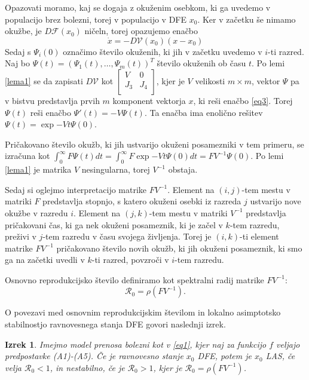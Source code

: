 \documentclass[a4paper,12pt]{article}
\newcommand{\R}{\mathcal R}
\newcommand{\F}{\mathcal F}
\newcommand{\V}{\mathcal V}
\newtheorem{izrek}{Izrek}
\begin{document}
Opazovati moramo, kaj se dogaja z okuženim osebkom, ki ga uvedemo v populacijo brez 
bolezni, torej v populacijo v DFE \(x_0\). Ker v začetku še nimamo okužbe, je 
\(D\F(x_0)\) ničeln, torej opazujemo enačbo
\begin{equation}\label{eq3}
    \dot{x}=-D\V(x_0)(x-x_0)
\end{equation}
Sedaj s \(\Psi_i(0)\) označimo število okuženih, ki jih v začetku uvedemo v \(i\)-ti 
razred. Naj bo \(\Psi(t)=(\Psi_1(t),\ldots,\Psi_m(t))^T\) število okuženih ob času \(t\). 
Po lemi \ref{lema1} se da zapisati \(D\V\) kot 
\(
\begin{bmatrix}
    V & 0 \\
    J_3 & J_4 \\
\end{bmatrix}
\),
kjer je \(V\) velikosti \(m \times m\), vektor \(\Psi\) pa v bistvu
predstavlja prvih \(m\) komponent vektorja \(x\), ki reši enačbo \ref{eq3}. Torej 
\(\Psi(t)\) reši enačbo \(\Psi'(t)=-V\Psi(t)\). Ta enačba ima enolično rešitev 
\(\Psi(t)=\exp{-Vt}\Psi(0)\).

Pričakovano število okužb, ki jih ustvarijo okuženi posamezniki v tem primeru,
se izračuna kot \(\int_0^\infty F\Psi(t)dt = \int_0^\infty F\exp{-Vt}\Psi(0)dt = FV^{-1}\Psi(0)\).
Po lemi \ref{lema1} je matrika \(V\) nesingularna, torej \(V^{-1}\) obstaja. 

Sedaj si oglejmo interpretacijo matrike \(FV^{-1}\). Element na \((i,j)\)-tem mestu
v matriki \(F\) predstavlja stopnjo, s katero okuženi osebki iz razreda \(j\)
ustvarijo nove okužbe v razredu \(i\). Element na \((j,k)\)-tem mestu v matriki \(V^{-1}\)
predstavlja pričakovani čas, ki ga nek okuženi posameznik, ki je začel v \(k\)-tem razredu, 
preživi v \(j\)-tem razredu v času svojega življenja. Torej je \((i,k)\)-ti element 
matrike \(FV^{-1}\) pričakovano število novih okužb, ki jih okuženi posameznik, ki 
smo ga na začetki uvedli v \(k\)-ti razred, povzroči v \(i\)-tem razredu.

Osnovno reprodukcijsko število definiramo kot spektralni radij matrike \(FV^{-1}\):
\[\R_0=\rho(FV^{-1}).\]

O povezavi med osnovnim reprodukcijskim številom in lokalno asimptotsko stabilnostjo 
ravnovesnega stanja DFE govori naslednji izrek.

\begin{izrek}\label{izrek1}
    Imejmo model prenosa bolezni kot v \ref{eq1}, kjer naj za funkcijo \(f\) veljajo
    predpostavke (A1)-(A5). Če je ravnovesno stanje \(x_0\) DFE, potem je \(x_0\) LAS, 
    če velja \(\R_0<1\), in nestabilno, če je \(\R_0>1\), kjer je \(\R_0=\rho(FV^{-1})\).
\end{izrek}
\end{document}
